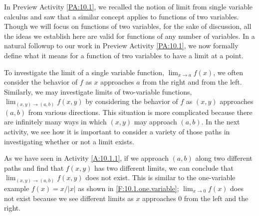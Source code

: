 In Preview Activity \ref{PA:10.1}, we recalled the notion of limit
from single variable calculus and saw that a similar concept applies
to functions of two variables.
Though we will focus on functions of two variables, for the sake of
discussion, all the ideas we establish here are valid for functions of
any number of variables. In a natural followup to our work in Preview Activity \ref{PA:10.1},
we now formally define what it means for a function of two variables to have a
limit at a point.

\vspace*{5pt}
\nin {}
\vspace*{5pt}

To investigate the limit of a single variable function, $\lim_{x\to
  a}f(x)$, we often consider the behavior of $f$ as $x$ approaches
$a$ from the right and from the left.  Similarly, we may investigate
limits of two-variable functions, $\lim_{(x,y)\to(a,b)} f(x,y)$ by
considering the behavior of $f$ as $(x,y)$ approaches $(a,b)$ from
various directions.  This situation is more complicated because there
are infinitely many ways in which $(x,y)$ may approach $(a,b)$.  In the next activity, we
see how it is important to consider a variety of those paths in investigating whether or not a limit exists.



As we have seen in Activity \ref{A:10.1.1}, if we approach $(a,b)$
along two different paths and find that $f(x,y)$ has two different
limits, we can conclude that $\lim_{(x,y)\to(a,b)}f(x,y)$ does not
exist.  This is similar
to the one-variable example $f(x)=x/|x|$ as shown in
\ref{F:10.1.one.variable}; 
$\lim_{x\to0}f(x)$ does not exist because we see different limits as
$x$ approaches 0 from the left and the right.

